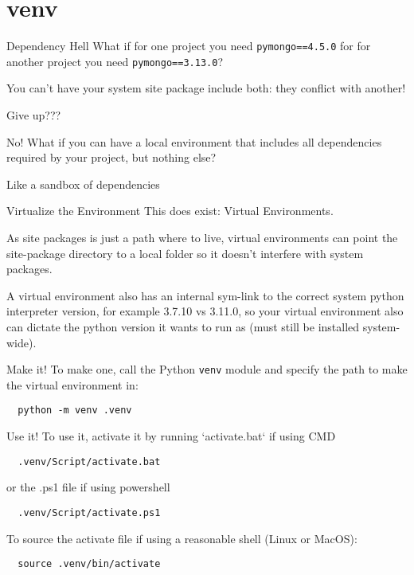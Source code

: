 \section{venv}
\begin{frame}[containsverbatim]{Dependency Hell}
  What if for one project you need \verb|pymongo==4.5.0| for for another project you need \verb|pymongo==3.13.0|?

  You can't have your system site package include both: they conflict with another! \pause

  Give up???
\end{frame}

\begin{frame}{No!}
  What if you can have a local environment that includes all dependencies required by your project, but nothing else?

  Like a sandbox of dependencies
\end{frame}

\begin{frame}{Virtualize the Environment}
  This does exist: Virtual Environments.

  As site packages is just a path where to live, virtual environments can point the site-package directory to a local folder so it doesn't interfere with system packages.

  A virtual environment also has an internal sym-link to the correct system python interpreter version, for example 3.7.10 vs 3.11.0, so your virtual environment also can dictate the python version it wants to run as (must still be installed system-wide).
\end{frame}

\begin{frame}[containsverbatim]{Make it!}
  To make one, call the Python \verb|venv| module and specify the path to make the virtual environment in:
  \begin{verbatim}
  python -m venv .venv
  \end{verbatim}
\end{frame}

\begin{frame}[containsverbatim]{Use it!}
  To use it, activate it by running `activate.bat` if using CMD
  \begin{verbatim}
  .venv/Script/activate.bat
  \end{verbatim}

  or the .ps1 file if using powershell
  \begin{verbatim}
  .venv/Script/activate.ps1
  \end{verbatim}

  To source the activate file if using a reasonable shell (Linux or MacOS):
  \begin{verbatim}
  source .venv/bin/activate
  \end{verbatim}
\end{frame}

